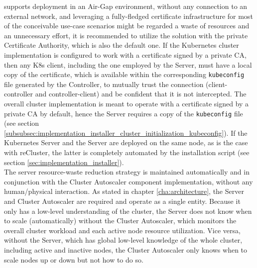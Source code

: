 supports deployment in an Air-Gap environment, without any connection to an
external network, and leveraging a fully-fledged certificate infrastructure for most
of the conceivable use-case scenarios might be regarded a waste of resources and
an unnecessary effort, it is recommended to utilize the solution with the
private Certificate Authority, which is also the default one. If the Kubernetes
cluster implementation is configured to work with a certificate signed by a
private CA, then any K8s client, including the one employed by the Server, must have
a local copy of the certificate, which is available within the corresponding
\texttt{kubeconfig} file generated by the Controller, to mutually trust the
connection (client-controller and controller-client) and be confident that it is
not intercepted\cite{k8s_api_access}. The overall cluster implementation is
meant to operate with a certificate signed by a private CA by default, hence the
Server requires a copy of the \texttt{kubeconfig} file (see section \ref{subsubsec:implementation_installer_cluster_initialization_kubeconfig}).
If the Kubernetes Server and the Server are deployed on the same node, as is the
case with reCluster, the latter is completely automated by the installation script
(see section \ref{sec:implementation_installer}). \\ %
The server resource-waste reduction strategy is maintained automatically and in conjunction
with the Cluster Autoscaler component implementation, without any human/physical
interaction. As stated in chapter \ref{cha:architecture}, the Server and Cluster
Autoscaler are required and operate as a single entity. Because it only has a low-level
understanding of the cluster, the Server does not know when to scale (automatically)
without the Cluster Autoscaler, which monitors the overall cluster workload and each
active node resource utilization. Vice versa, without the Server, which has
global low-level knowledge of the whole cluster, including active and inactive nodes,
the Cluster Autoscaler only knows when to scale nodes up or down but not how to
do so.

